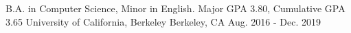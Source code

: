 

\begin{cventries}

  \cventry
    {B.A. in Computer Science, Minor in English. Major GPA 3.80, Cumulative GPA 3.65} %
    {University of California, Berkeley} %
    {Berkeley, CA} %
    {Aug. 2016 - Dec. 2019} %
    {}
\end{cventries}
